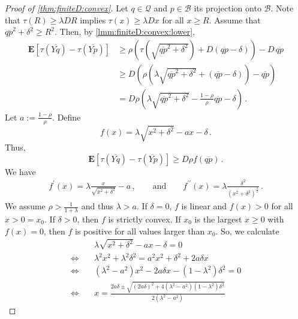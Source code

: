 \documentclass{article}
\newcommand*{\mc}[1]{\mathcal{#1}}
\newcommand{\lab}{\left[} %
\newcommand{\rab}{\right]} %
\newcommand{\ab}[1]{\lab #1 \rab} %
\newcommand{\abOf}[1]{\!\ab{#1}} %
\newcommand{\lb}{\left(} %
\newcommand{\rb}{\right)} %
\newcommand{\br}[1]{\lb #1 \rb} %
\newcommand{\brOf}[1]{\!\br{#1}} %
\newcommand{\E}{\mathbf{E}} %
\newcommand{\EOf}[1]{\E\abOf{#1}}
\newcommand{\pr}{^\prime}
\newcommand{\prr}{^{\prime\prime}}
\newcommand{\eqcm}{\,,} %
\newcommand{\eqfs}{\,.}
\newcommand{\ol}[2]{\overline{#1#2}}
\newcommand{\tran}{\tau}
\begin{document}
\begin{proof}[Proof of \cref{thm:finiteD:convex}]
    Let $q\in\mc Q$ and $p \in \mc B$ its projection onto $\mc B$. Note that $\tran(R) \geq \lambda D R$ implies $\tran(x) \geq \lambda D x$ for all $x\geq R$. Assume that $\ol qp^2 + \delta^2 \geq R^2$. Then, by \cref{lmm:finiteD:convex:lower}, 
    \begin{align}
        \EOf{\tran(\ol Yq) - \tran(\ol Yp)} 
        &\geq 
        \rho \br{\tran\brOf{\sqrt{\ol qp^2 + \delta^2}} + D (\ol qp - \delta)} - D\, \ol qp
        \\&\geq 
        D \br{\rho \br{\lambda\sqrt{\ol qp^2 + \delta^2} + (\ol qp - \delta)} - \ol qp}
        \\&= 
        D \rho \br{\lambda \sqrt{\ol qp^2 + \delta^2} - \frac{1-\rho}{\rho}  \ol qp - \delta}
        \eqfs
    \end{align}
    Let $a := \frac{1-\rho}{\rho}$. Define
    \begin{equation}
        f(x) = \lambda \sqrt{x^2 + \delta^2} - a x - \delta
        \eqfs
    \end{equation}
    Thus,
    \begin{equation}\label{eq:finiteD:convex:basicvi}
        \EOf{\tran(\ol Yq) - \tran(\ol Yp)}  \geq D \rho f(\ol qp)
        \eqfs
    \end{equation}
    We have
    \begin{align}
        f\pr(x) = \lambda \frac{x}{\sqrt{x^2 + \delta^2}} - a
        \eqcm
        \qquad\text{and}\qquad
        f\prr(x) = \lambda \frac{\delta^2}{(x^2+\delta^2)^{\frac32}}
        \eqfs
    \end{align}
    We assume $\rho > \frac1{1+\lambda}$ and thus $\lambda > a$.
    If $\delta = 0$, $f$ is linear and $f(x)>0$ for all $x > 0 = x_0$. If $\delta > 0$, then $f$ is strictly convex. If $x_0$ is the largest $x\geq0$ with $f(x) = 0$, then $f$ is positive for all values larger than $x_0$. So, we calculate
    \begin{align}
        &\lambda \sqrt{x^2 + \delta^2} - a x - \delta = 0
        \\\Leftrightarrow\quad &
        \lambda^2 x^2 + \lambda^2 \delta^2 = a^2 x^2 + \delta^2 + 2 a \delta x
        \\\Leftrightarrow\quad &
        (\lambda^2 - a^2) x^2 - 2 a \delta x - (1-\lambda^2) \delta^2= 0
        \\\Leftrightarrow\quad &
        x = \frac{2 a \delta \pm \sqrt{(2 a \delta)^2 + 4 (\lambda^2 - a^2) (1-\lambda^2) \delta^2}}{2 (\lambda^2 - a^2)}

\end{align}
\end{proof}
\end{document}

